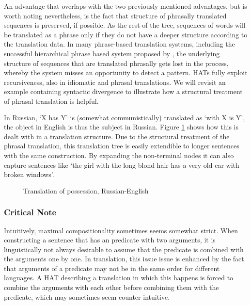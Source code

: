 \documentclass[hidelinks]{report}
\begin{document}
An advantage that overlaps with the two previously mentioned advantages, but is worth noting nevertheless, is the fact that structure of phrasally translated sequences is preserved, if possible. As the rest of the tree, sequences of words will be translated as a phrase only if they do not have a deeper structure according to the translation data. In many phrase-based translation systems, including the successful hierarchical phrase based system proposed by \cite{chiang2007hierarchical}, the underlying structure of sequences that are translated phrasally gets lost in the process, whereby the system misses an opportunity to detect a pattern. HATs fully exploit recursiveness, also in idiomatic and phrasal translations. We will revisit an example containing syntactic divergence to illustrate how a structural treatment of phrasal translation is helpful.

In Russian, `X has Y' is (somewhat communistically) translated as `with X is Y', the object in English is thus the subject in Russian. Figure \ref{fig:russian1} shows how this is dealt with in a translation structure. Due to the structural treatment of the phrasal translation, this translation tree is easily extendible to longer sentences with the same construction. By expanding the non-terminal nodes it can also capture sentences like `the girl with the long blond hair has a very old car with broken windows'.

\begin{figure}[!ht]
\centering

\caption{Translation of possession, Russian-English}\label{fig:russian1}
\end{figure}


\subsubsection{Critical Note}

Intuitively, maximal compositionality sometimes seems somewhat strict. When constructing a sentence that has an predicate with two arguments, it is linguistically not always desirable to assume that the predicate is combined with the arguments one by one. In translation, this issue issue is enhanced by the fact that arguments of a predicate may not be in the same order for different languages. A HAT describing a translation in which this happens is forced to combine the arguments with each other before combining them with the predicate, which may sometimes seem counter intuitive.
\end{document}
